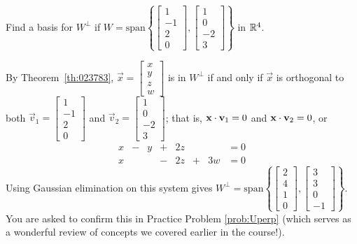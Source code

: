 \documentclass{ximera}
\begin{document}
\begin{example}\label{ex:023829}
Find a basis for $W^\perp$ if $W = \mbox{span}\left\{\begin{bmatrix}
  1 \\ -1 \\ 2 \\ 0
  \end{bmatrix},
  \begin{bmatrix}
  1 \\ 0 \\ -2 \\ 3
  \end{bmatrix}\right\}$ in $\mathbb{R}^4$.

\begin{explanation}
  By Theorem~\ref{th:023783}, $\vec{x} = \begin{bmatrix}
  x \\ y \\ z \\ w
  \end{bmatrix}$
  is in $W^\perp$ if and only if $\vec{x}$ is orthogonal to both 
  $\vec{v}_1 = \begin{bmatrix}
  1 \\ -1 \\ 2 \\ 0
  \end{bmatrix}$ and
  $\vec{v}_2 = \begin{bmatrix}
  1 \\ 0 \\ -2 \\ 3
  \end{bmatrix}$; that is,
  $\mathbf{x} \cdot \mathbf{v}_1 = 0$ and $\mathbf{x} \cdot \mathbf{v}_2 = 0$, or
\begin{equation*}
\begin{array}{rrrrrrrr}
x & - & y & + & 2z & & & =0\\
x & & & - & 2z & +& 3w & =0
\end{array}
\end{equation*}
Using Gaussian elimination on this system gives $W^\perp = \mbox{span}\left\{\begin{bmatrix}
  2 \\ 4 \\ 1 \\ 0
  \end{bmatrix},
  \begin{bmatrix}
  3 \\ 3 \\ 0 \\ -1
  \end{bmatrix}\right\}$.  You are asked to confirm this in Practice Problem \ref{prob:Uperp} (which serves as a wonderful review of concepts we covered earlier in the course!).  
\end{explanation}
\end{example}
\end{document}

